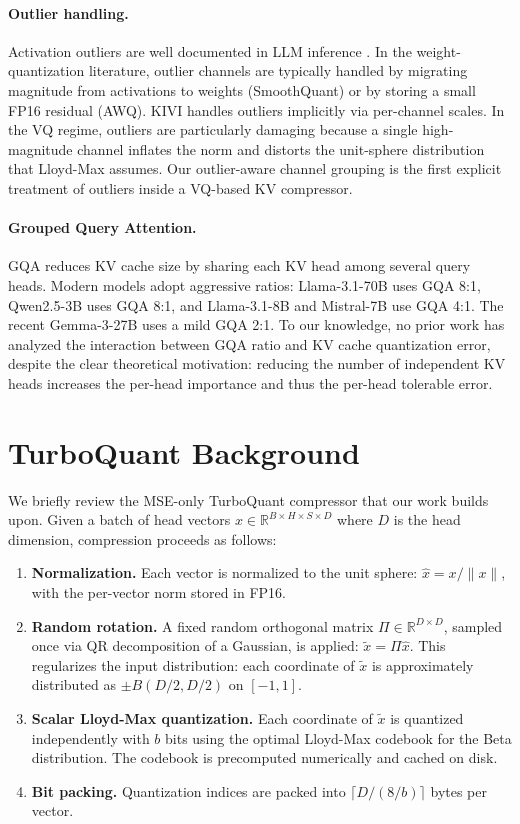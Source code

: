 \documentclass[11pt]{article}
\begin{document}
\paragraph{Outlier handling.}
Activation outliers are well documented in LLM inference \cite{smoothquant2022,awq2024}. In the weight-quantization literature, outlier channels are typically handled by migrating magnitude from activations to weights (SmoothQuant) or by storing a small FP16 residual (AWQ). KIVI handles outliers implicitly via per-channel scales. In the VQ regime, outliers are particularly damaging because a single high-magnitude channel inflates the norm and distorts the unit-sphere distribution that Lloyd-Max assumes. Our outlier-aware channel grouping is the first explicit treatment of outliers inside a VQ-based KV compressor.

\paragraph{Grouped Query Attention.}
GQA \cite{gqa2023} reduces KV cache size by sharing each KV head among several query heads. Modern models adopt aggressive ratios: Llama-3.1-70B uses GQA 8:1, Qwen2.5-3B uses GQA 8:1, and Llama-3.1-8B and Mistral-7B use GQA 4:1. The recent Gemma-3-27B uses a mild GQA 2:1. To our knowledge, no prior work has analyzed the interaction between GQA ratio and KV cache quantization error, despite the clear theoretical motivation: reducing the number of independent KV heads increases the per-head importance and thus the per-head tolerable error.

\section{TurboQuant Background}
\label{sec:background}

We briefly review the MSE-only TurboQuant compressor that our work builds upon. Given a batch of head vectors $x \in \mathbb{R}^{B \times H \times S \times D}$ where $D$ is the head dimension, compression proceeds as follows:

\begin{enumerate}
    \item \textbf{Normalization.} Each vector is normalized to the unit sphere: $\hat x = x / \|x\|$, with the per-vector norm stored in FP16.
    \item \textbf{Random rotation.} A fixed random orthogonal matrix $\Pi \in \mathbb{R}^{D \times D}$, sampled once via QR decomposition of a Gaussian, is applied: $\tilde x = \Pi \hat x$. This regularizes the input distribution: each coordinate of $\tilde x$ is approximately distributed as $\pm B(D/2, D/2)$ on $[-1, 1]$.
    \item \textbf{Scalar Lloyd-Max quantization.} Each coordinate of $\tilde x$ is quantized independently with $b$ bits using the optimal Lloyd-Max codebook for the Beta distribution. The codebook is precomputed numerically and cached on disk.
    \item \textbf{Bit packing.} Quantization indices are packed into $\lceil D / (8/b) \rceil$ bytes per vector.
\end{enumerate}
\end{document}
